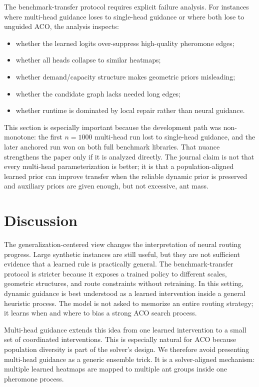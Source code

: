 \documentclass[11pt]{article}
\begin{document}
The benchmark-transfer protocol requires explicit failure analysis.
For instances where multi-head guidance loses to single-head guidance or where both lose to unguided ACO, the analysis inspects:
\begin{itemize}
    \item whether the learned logits over-suppress high-quality pheromone edges;
    \item whether all heads collapse to similar heatmaps;
    \item whether demand/capacity structure makes geometric priors misleading;
    \item whether the candidate graph lacks needed long edges;
    \item whether runtime is dominated by local repair rather than neural guidance.
\end{itemize}
This section is especially important because the development path was non-monotone: the first $n=1000$ multi-head run lost to single-head guidance, and the later anchored run won on both full benchmark libraries.
That nuance strengthens the paper only if it is analyzed directly.
The journal claim is not that every multi-head parameterization is better; it is that a population-aligned learned prior can improve transfer when the reliable dynamic prior is preserved and auxiliary priors are given enough, but not excessive, ant mass.

\section{Discussion}
\label{sec:discussion}

The generalization-centered view changes the interpretation of neural routing progress.
Large synthetic instances are still useful, but they are not sufficient evidence that a learned rule is practically general.
The benchmark-transfer protocol is stricter because it exposes a trained policy to different scales, geometric structures, and route constraints without retraining.
In this setting, dynamic guidance is best understood as a learned intervention inside a general heuristic process.
The model is not asked to memorize an entire routing strategy; it learns when and where to bias a strong ACO search process.

Multi-head guidance extends this idea from one learned intervention to a small set of coordinated interventions.
This is especially natural for ACO because population diversity is part of the solver's design.
We therefore avoid presenting multi-head guidance as a generic ensemble trick.
It is a solver-aligned mechanism: multiple learned heatmaps are mapped to multiple ant groups inside one pheromone process.
\end{document}
